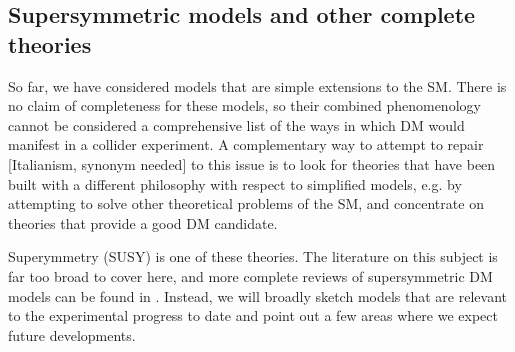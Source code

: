 
\subsection{Supersymmetric models and other complete theories}
\label{sec:SUSYModels}

So far, we have considered models that are simple extensions to the SM. There is no claim of completeness for these models,
so their combined phenomenology cannot be considered a comprehensive list of the ways in which DM would manifest in a collider experiment.
A complementary way to attempt to repair [Italianism, synonym needed] to this issue is to look for theories that have been built with
a different philosophy with respect to simplified models, e.g. by attempting to solve other theoretical problems of the SM, 
and concentrate on theories that provide a good DM candidate. 

Superymmetry (SUSY) is one of these theories.
The literature on this subject is far too broad to cover here, and more complete reviews of supersymmetric DM models can
be found in \cite{Feng:2010gw,Ellis:2010kf}. Instead, we will broadly sketch models that are relevant to
the experimental progress to date and point out a few areas where we expect future developments. 


